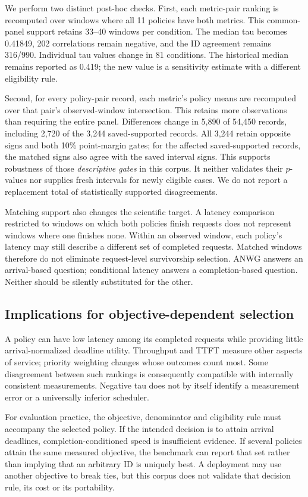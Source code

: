 We perform two distinct post-hoc checks. First, each metric-pair ranking
is recomputed over windows where all 11 policies have both metrics.
This common-panel support retains 33--40 windows per condition. The
median tau becomes 0.41849, 202 correlations remain negative, and the ID
agreement remains 316/990. Individual tau values change in 81 conditions.
The historical median remains reported as 0.419; the new value is a
sensitivity estimate with a different eligibility rule.

Second, for every policy-pair record, each metric's policy means are
recomputed over that pair's observed-window intersection. This retains
more observations than requiring the entire panel. Differences change
in 5,890 of 54,450 records, including 2,720 of the 3,244 saved-supported
records. All 3,244 retain opposite signs and both 10\% point-margin gates;
for the affected saved-supported records, the matched signs also agree
with the saved interval signs. This supports robustness of those
\emph{descriptive gates} in this corpus. It neither validates their
$p$-values nor supplies fresh intervals for newly eligible cases. We do
not report a replacement total of statistically supported disagreements.

Matching support also changes the scientific target. A latency comparison
restricted to windows on which both policies finish requests does not
represent windows where one finishes none. Within an observed window,
each policy's latency may still describe a different set of completed
requests. Matched windows therefore do not eliminate request-level
survivorship selection. ANWG answers an arrival-based question; conditional
latency answers a completion-based question. Neither should be silently
substituted for the other.

\subsection{Implications for objective-dependent selection}
A policy can have low latency among its completed requests while providing
little arrival-normalized deadline utility. Throughput and TTFT measure
other aspects of service; priority weighting changes whose outcomes count
most. Some disagreement between such rankings is consequently compatible
with internally consistent measurements. Negative tau does not by itself
identify a measurement error or a universally inferior scheduler.

For evaluation practice, the objective, denominator and eligibility rule
must accompany the selected policy. If the intended decision is to attain
arrival deadlines, completion-conditioned speed is insufficient evidence.
If several policies attain the same measured objective, the benchmark can
report that set rather than implying that an arbitrary ID is uniquely
best. A deployment may use another objective to break ties, but this
corpus does not validate that decision rule, its cost or its portability.

